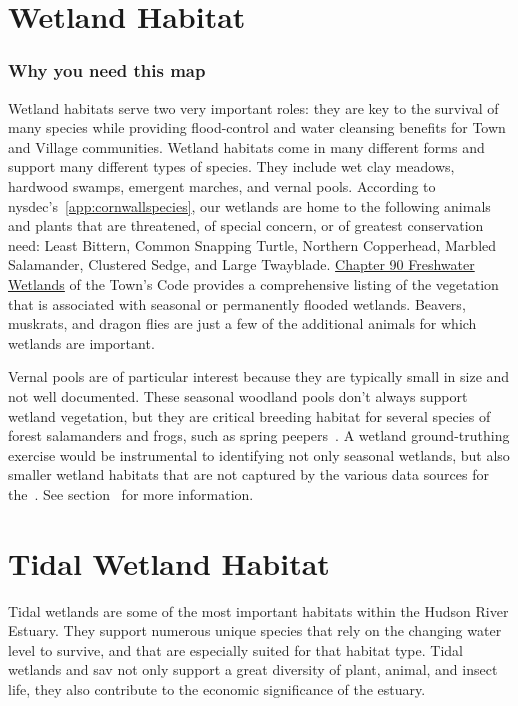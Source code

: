 \chapter{Wetland Habitat}
\subsection*{Why you need this map}
Wetland habitats serve two very important roles: they are key to the survival
of many species while providing flood-control and water cleansing benefits for
Town and Village communities. Wetland habitats come in many different forms and
support many different types of species. They include wet clay meadows,
hardwood swamps, emergent marches, and vernal pools. According to
\gls{nysdec}'s~\ref{app:cornwallspecies}, our wetlands are home to the following
animals and plants that are threatened, of special concern, or of greatest
conservation need: Least Bittern, Common Snapping Turtle, Northern Copperhead,
Marbled Salamander, Clustered Sedge, and Large Twayblade.
\href{https://ecode360.com/10555547?highlight=wetlands#10555547}{Chapter 90
Freshwater Wetlands} of the Town’s Code provides a comprehensive listing of the
vegetation that is associated with seasonal or permanently flooded wetlands.
Beavers, muskrats, and dragon flies are just a few of the additional animals
for which wetlands are important.

Vernal pools are of particular interest because they are typically small in
size and not well documented. These seasonal woodland pools don't always
support wetland vegetation, but they are critical breeding habitat for several
species of forest salamanders and frogs, such as spring
peepers~\citep{haeckel2014}. A wetland ground-truthing exercise would be
instrumental to identifying not only seasonal wetlands, but also smaller
wetland habitats that are not captured by the various data sources for the~.
See section~ for more information.

\label{map:tidalwetlandsandSAV}
\chapter{Tidal Wetland Habitat}\label{subsec:tidalandwetlandhabitat}
Tidal wetlands are some of the most important habitats within the Hudson River
Estuary. They support numerous unique species that rely on the changing water
level to survive, and that are especially suited for that habitat type. Tidal
wetlands and \gls{sav} not only support a great diversity of plant, animal, and
insect life, they also contribute to the economic significance of the estuary.

